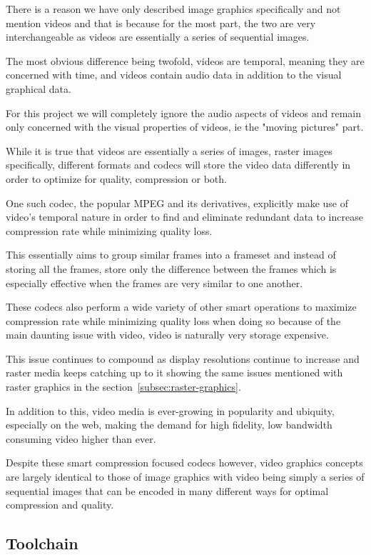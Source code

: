 \documentclass[12pt]{article}
\newcommand{\sentence}{} %
\renewcommand{\fullref}[1]{\ref{#1}\nameref{#1}}
\begin{document}
    \tab
    There is a reason we have only described image graphics specifically and not mention videos and
    that is because for the most part, the two are very interchangeable as videos are essentially a series of
    sequential images.
    \sentence
    The most obvious difference being twofold, videos are temporal, meaning they are concerned with time, and videos
    contain audio data in addition to the visual graphical data.
    \sentence
    For this project we will completely ignore the audio aspects of videos and remain only concerned with the visual
    properties of videos, ie the "moving pictures" part.
    \sentence
    While it is true that videos are essentially a series of images, raster images specifically, different formats
    and codecs will store the video data differently in order to optimize for quality, compression or both.
    \sentence
    One such codec, the popular MPEG and its derivatives, explicitly make use of video's temporal nature in order to
    find and eliminate redundant data to increase compression rate while minimizing quality loss.
    \sentence
    This essentially aims to group similar frames into a frameset and instead of storing all the frames, store only
    the difference between the frames which is especially effective when the frames are very similar to one another.
    \sentence
    These codecs also perform a wide variety of other smart operations to maximize compression rate while minimizing
    quality loss when doing so because of the main daunting issue with video, video is naturally very storage expensive.
    \sentence
    This issue continues to compound as display resolutions continue to increase and raster media keeps catching up
    to it showing the same issues mentioned with raster graphics in the section~\fullref{subsec:raster-graphics}.
    \sentence
    In addition to this, video media is ever-growing in popularity and ubiquity, especially on the web, making the
    demand for high fidelity, low bandwidth consuming video higher than ever.
    \sentence
    Despite these smart compression focused codecs however, video graphics concepts are largely identical to those of
    image graphics with video being simply a series of sequential images that can be encoded in many different ways
    for optimal compression and quality.

    \subsection{Toolchain}\label{subsec:toolchain}
\end{document}
